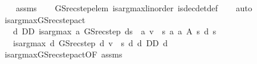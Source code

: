\begin{isabellebody}
%
\isadelimproof
\ \ %
\endisadelimproof
%
\isatagproof
{}\isamarkupfalse%
\ assms\isanewline
\ \ \isamarkupfalse%
\ GS{\isacharunderscore}{\kern0pt}rec{\isacharunderscore}{\kern0pt}step{\isacharunderscore}{\kern0pt}elem\ is{\isacharunderscore}{\kern0pt}arg{\isacharunderscore}{\kern0pt}max{\isacharunderscore}{\kern0pt}linorder\ is{\isacharunderscore}{\kern0pt}dec{\isacharunderscore}{\kern0pt}det{\isacharunderscore}{\kern0pt}def\isanewline
\ \ \isamarkupfalse%
\ auto%
\endisatagproof
{\isafoldproof}%
%
\isadelimproof
\isanewline
%
\endisadelimproof
\isanewline
{}\isamarkupfalse%
\ is{\isacharunderscore}{\kern0pt}arg{\isacharunderscore}{\kern0pt}max{\isacharunderscore}{\kern0pt}GS{\isacharunderscore}{\kern0pt}rec{\isacharunderscore}{\kern0pt}step{\isacharunderscore}{\kern0pt}act{\isacharprime}{\kern0pt}{\isacharcolon}{\kern0pt}\isanewline
\ \ \ {\isachardoublequoteopen}d\ {\isasymin}D\isactrlsub D{\isachardoublequoteclose}\ {\isachardoublequoteopen}is{\isacharunderscore}{\kern0pt}arg{\isacharunderscore}{\kern0pt}max\ {\isacharparenleft}{\kern0pt}{\isasymlambda}a{\isachardot}{\kern0pt}\ GS{\isacharunderscore}{\kern0pt}rec{\isacharunderscore}{\kern0pt}step\ {\isacharparenleft}{\kern0pt}d{\isacharprime}{\kern0pt}{\isacharparenleft}{\kern0pt}s\ {\isacharcolon}{\kern0pt}{\isacharequal}{\kern0pt}\ a{\isacharparenright}{\kern0pt}{\isacharparenright}{\kern0pt}\ v\ {\isachardollar}{\kern0pt}\ s{\isacharparenright}{\kern0pt}\ {\isacharparenleft}{\kern0pt}{\isasymlambda}a{\isachardot}{\kern0pt}\ a\ {\isasymin}A\ s{\isacharparenright}{\kern0pt}\ {\isacharparenleft}{\kern0pt}d\ s{\isacharparenright}{\kern0pt}{\isachardoublequoteclose}\ \isanewline
\ \ \ {\isachardoublequoteopen}is{\isacharunderscore}{\kern0pt}arg{\isacharunderscore}{\kern0pt}max\ {\isacharparenleft}{\kern0pt}{\isasymlambda}d{\isachardot}{\kern0pt}\ GS{\isacharunderscore}{\kern0pt}rec{\isacharunderscore}{\kern0pt}step\ d\ v\ {\isachardollar}{\kern0pt}\ s{\isacharparenright}{\kern0pt}\ {\isacharparenleft}{\kern0pt}{\isasymlambda}d{\isachardot}{\kern0pt}\ d\ {\isasymin}D\isactrlsub D{\isacharparenright}{\kern0pt}\ d{\isachardoublequoteclose}\isanewline
%
\isadelimproof
\ \ %
\endisadelimproof
%
\isatagproof
{}\isamarkupfalse%
\ is{\isacharunderscore}{\kern0pt}arg{\isacharunderscore}{\kern0pt}max{\isacharunderscore}{\kern0pt}GS{\isacharunderscore}{\kern0pt}rec{\isacharunderscore}{\kern0pt}step{\isacharunderscore}{\kern0pt}act{\isacharbrackleft}{\kern0pt}OF\ assms{\isacharbrackright}{\kern0pt}\isanewline

\end{isabellebody}
